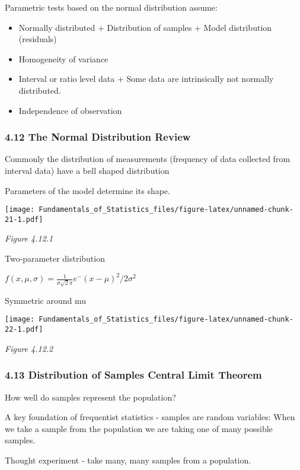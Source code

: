 \documentclass[]{article}
\begin{document}
Parametric tests based on the normal distribution assume:

\begin{itemize}
\item
  Normally distributed + Distribution of samples + Model distribution
  (residuals)
\item
  Homogeneity of variance
\item
  Interval or ratio level data + Some data are intrinsically not
  normally distributed.
\item
  Independence of observation
\end{itemize}

\hypertarget{the-normal-distribution-review}{%
\subsubsection{4.12 The Normal Distribution
Review}\label{the-normal-distribution-review}}

Commonly the distribution of measurements (frequency of data collected
from interval data) have a bell shaped distribution

Parameters of the model determine its shape.

\texttt{[image: Fundamentals\_of\_Statistics\_files/figure-latex/unnamed-chunk-21-1.pdf]}

\emph{Figure 4.12.1}

Two-parameter distribution

\(f(x,\mu,\sigma)=\frac{1}{\sigma\sqrt2\pi}e^-(x-\mu)^2/2\sigma^2\)

Symmetric around mu

\texttt{[image: Fundamentals\_of\_Statistics\_files/figure-latex/unnamed-chunk-22-1.pdf]}

\emph{Figure 4.12.2}

\hypertarget{distribution-of-samples-central-limit-theorem}{%
\subsubsection{4.13 Distribution of Samples Central Limit
Theorem}\label{distribution-of-samples-central-limit-theorem}}

How well do samples represent the population?

A key foundation of frequentist statistics - samples are random
variables: When we take a sample from the population we are taking one
of many possible samples.

Thought experiment - take many, many samples from a population.
\end{document}
